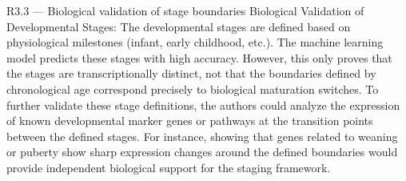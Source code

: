 \documentclass[11pt,a4paper]{article}
\begin{document}
\begin{reviewerbox}{R3.3 — Biological validation of stage boundaries}
Biological Validation of Developmental Stages: The developmental stages are
defined based on physiological milestones (infant, early childhood, etc.).
The machine learning model predicts these stages with high accuracy. However,
this only proves that the stages are transcriptionally distinct, not that the
boundaries defined by chronological age correspond precisely to biological
maturation switches. To further validate these stage definitions, the authors
could analyze the expression of known developmental marker genes or pathways
at the transition points between the defined stages. For instance, showing
that genes related to weaning or puberty show sharp expression changes around
the defined boundaries would provide independent biological support for the
staging framework.
\end{reviewerbox}
\end{document}
